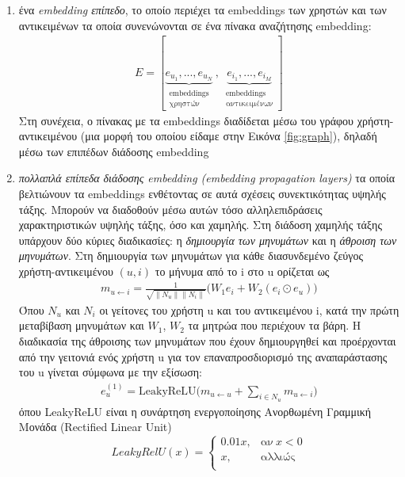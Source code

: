  \begin{enumerate}
	\item ένα \textit{embedding επίπεδο}, το οποίο περιέχει τα embeddings των χρηστών και των αντικειμένων τα οποία συνενώνονται σε ένα πίνακα αναζήτησης embedding: \begin{align} Ε =[\underbrace{e_{u_1},...,e_{u_N}}_{\substack {\text{embeddings}\\ \text{χρηστών}}}\:, \: \underbrace{e_{i_1},...,e_{i_M}}_{\substack{\text{embeddings} \\ \text{αντικειμένων}}}]
	 \end{align}
	 Στη συνέχεια, ο πίνακας με τα embeddings διαδίδεται μέσω του γράφου χρήστη-αντικειμένου (μια μορφή του οποίου είδαμε στην Εικόνα \ref{fig:graph}), δηλαδή μέσω των επιπέδων διάδοσης embedding
	\item \textit{πολλαπλά επίπεδα διάδοσης embedding (embedding propagation layers)} τα οποία βελτιώνουν τα embeddings ενθέτοντας σε αυτά σχέσεις συνεκτικότητας υψηλής τάξης. Μπορούν να διαδοθούν μέσω αυτών τόσο αλληλεπιδράσεις χαρακτηριστικών υψηλής τάξης, όσο και χαμηλής. Στη διάδοση χαμηλής τάξης  υπάρχουν δύο κύριες διαδικασίες: η \textit{δημιουργία των μηνυμάτων} και η \textit{άθροιση των μηνυμάτων}. Στη δημιουργία των μηνυμάτων για κάθε διασυνδεμένο ζεύγος χρήστη-αντικειμένου $ \left(u, i \right)  $ το μήνυμα από το i στο u ορίζεται ως \begin{align} m_{u \leftarrow i} = \frac{1}{\sqrt{\| N_u\|\|N_i\|}} \bigg(W_1e_i + W_2\left( e_i \odot e_u\right)  \bigg) 
	\end{align} Όπου $ N_u $ και $ N_i $ οι γείτονες του χρήστη u και του αντικειμένου i, κατά την πρώτη μεταβίβαση μηνυμάτων και $ W_1 $, $ W_2 $ τα μητρώα που περιέχουν τα βάρη. Η διαδικασία της άθροισης των μηνυμάτων που έχουν δημιουργηθεί και προέρχονται από την γειτονιά ενός χρήστη u για τον επαναπροσδιορισμό της αναπαράστασης του u γίνεται σύμφωνα με την εξίσωση: 	\begin{align}
	e_u^{(1)} = \text{LeakyReLU}\bigg(m_{u \leftarrow u} + \sum_{i \in N_{u}} m_{u \leftarrow i} \bigg)	
\end{align}
όπου LeakyReLU \cite{maasRectifierNonlinearitiesImprove} είναι η συνάρτηση ενεργοποίησης Ανορθωμένη Γραμμική Μονάδα (Rectified Linear Unit) \begin{equation} 
	LeakyRelU(x) = \begin{cases} 0.01x, & \text{αν}\ x < 0 \\ x, & \text{αλλιώς} \\ \end{cases} 

\end{equation}
\end{enumerate}
